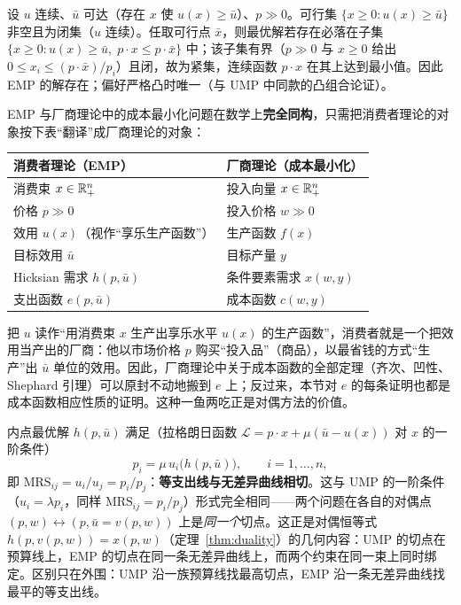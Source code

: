 \begin{remark}[解的存在性]
设 $u$ 连续、$\bar u$ 可达（存在 $x$ 使 $u(x)\ge\bar u$）、$p\gg0$。可行集 $\{x\ge0:u(x)\ge\bar u\}$ 非空且为闭集（$u$ 连续）。任取可行点 $\bar x$，则最优解若存在必落在子集 $\{x\ge0:u(x)\ge\bar u,\;p\cdot x\le p\cdot\bar x\}$ 中；该子集有界（$p\gg0$ 与 $x\ge0$ 给出 $0\le x_i\le(p\cdot\bar x)/p_i$）且闭，故为紧集，连续函数 $p\cdot x$ 在其上达到最小值。因此 EMP 的解存在；偏好严格凸时唯一（与 UMP 中同款的凸组合论证）。
\end{remark}

\begin{remark}[与厂商成本最小化的同构]\label{rem:isomorphism}
EMP 与厂商理论中的成本最小化问题在数学上\textbf{完全同构}，只需把消费者理论的对象按下表“翻译”成厂商理论的对象：
\begin{center}
\begin{tabular}{ll}
\toprule
消费者理论（EMP） & 厂商理论（成本最小化）\\
\midrule
消费束 $x\in\mathbb{R}^n_+$ & 投入向量 $x\in\mathbb{R}^n_+$\\
价格 $p\gg0$ & 投入价格 $w\gg0$\\
效用 $u(x)$（视作“享乐生产函数”） & 生产函数 $f(x)$\\
目标效用 $\bar u$ & 目标产量 $y$\\
Hicksian 需求 $h(p,\bar u)$ & 条件要素需求 $x(w,y)$\\
支出函数 $e(p,\bar u)$ & 成本函数 $c(w,y)$\\
\bottomrule
\end{tabular}
\end{center}
把 $u$ 读作“用消费束 $x$ 生产出享乐水平 $u(x)$ 的生产函数”，消费者就是一个把效用当产出的厂商：他以市场价格 $p$ 购买“投入品”（商品），以最省钱的方式“生产”出 $\bar u$ 单位的效用。因此，厂商理论中关于成本函数的全部定理（齐次、凹性、Shephard 引理）可以原封不动地搬到 $e$ 上；反过来，本节对 $e$ 的每条证明也都是成本函数相应性质的证明。这种一鱼两吃正是对偶方法的价值。
\end{remark}

\begin{remark}
内点最优解 $h(p,\bar u)$ 满足（拉格朗日函数 $\mathcal L=p\cdot x+\mu(\bar u-u(x))$ 对 $x$ 的一阶条件）
\[
 p_i=\mu\,u_i\bigl(h(p,\bar u)\bigr),\qquad i=1,\ldots,n,
\]
即 $\mathrm{MRS}_{ij}=u_i/u_j=p_i/p_j$：\textbf{等支出线与无差异曲线相切}。这与 UMP 的一阶条件（$u_i=\lambda p_i$，同样 $\mathrm{MRS}_{ij}=p_i/p_j$）形式完全相同——两个问题在各自的对偶点 $(p,w)\leftrightarrow(p,\bar u=v(p,w))$ 上是\emph{同一个}切点。这正是对偶恒等式 $h(p,v(p,w))=x(p,w)$（定理~\ref{thm:duality}）的几何内容：UMP 的切点在预算线上，EMP 的切点在同一条无差异曲线上，而两个约束在同一束上同时绑定。区别只在外围：UMP 沿一族预算线找最高切点，EMP 沿一条无差异曲线找最平的等支出线。
\end{remark}

